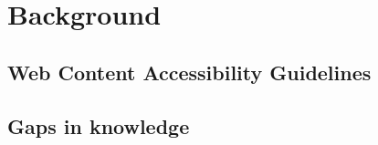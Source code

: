 \chapter{Background}\label{cha:background}


\section{Web Content Accessibility Guidelines}

\section{Gaps in knowledge}